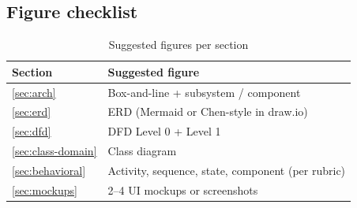 \subsection{Figure checklist}

\begin{table}[htbp]
  \centering
  \caption{Suggested figures per section}
  \begin{tabular}{@{}ll@{}}
    \toprule
    \textbf{Section} & \textbf{Suggested figure} \\
    \midrule
    \ref{sec:arch} & Box-and-line + subsystem / component \\
    \ref{sec:erd} & ERD (Mermaid or Chen-style in draw.io) \\
    \ref{sec:dfd} & DFD Level 0 + Level 1 \\
    \ref{sec:class-domain} & Class diagram \\
    \ref{sec:behavioral} & Activity, sequence, state, component (per rubric) \\
    \ref{sec:mockups} & 2--4 UI mockups or screenshots \\
    \bottomrule
  \end{tabular}
\end{table}

% 
